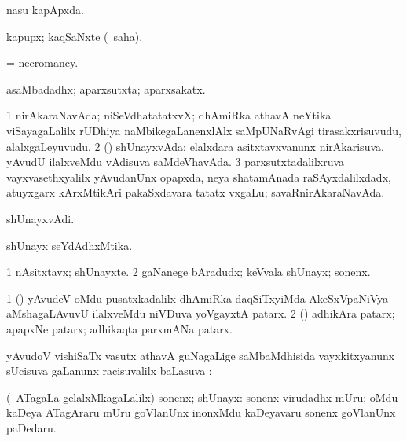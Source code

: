 \bentry
{}
\gl{\gu}
\bmng
nasu kapApxda. 
\emng
\eentry

\bentry
{}
\gl{\nA}
\bmng
kapupx; kaqSaNxte (\rUpa\ saha). 
\emng
\eentry

\bentry
{}
\gl{\nA}
\bmng
= \hyperlink{necromancy}{necromancy}. 
\emng
\eentry

\bentry
{}
\gl{\gu}
\expl{\Latin}
\bmng
asaMbadadhx; aparxsutxta; aparxsakatx. 
\emng
\eentry

\bentry
{}
\gl{\nA}
\bmng
\bnum
\num{1} nirAkaraNavAda; niSeVdhatatatxvX; dhAmiRka athavA neYtika viSayagaLalilx rUDhiya naMbikegaLanenxlAlx saMpUNaRvAgi tirasakxrisuvudu, alalxgaLeyuvudu. 
\num{2} (\tashA) shUnayxvAda; elalxdara asitxtavxvanunx nirAkarisuva, yAvudU ilalxveMdu vAdisuva saMdeVhavAda. 
\num{3} parxsutxtadalilxruva vayxvasethxyalilx yAvudanUnx opapxda, neya shatamAnada raSAyxdalilxdadx, atuyxgarx kArxMtikAri pakaSxdavara tatatx vxgaLu; savaRnirAkaraNavAda. 
\enum
\emng
\eentry

\bentry
{}
\gl{\nA}
\bmng
shUnayxvAdi. 
\emng
\eentry

\bentry
{}
\gl{\gu}
\bmng
shUnayx seYdAdhxMtika. 
\emng
\eentry

\bentry
{}
\gl{\nA}
\bmng
\bnum
\num{1} nAsitxtavx; shUnayxte. 
\num{2} gaNanege bAradudx; keVvala shUnayx; sonenx. 
\enum
\emng
\eentry

\bentry
{}
\gl{\nA}
\expl{\Latin}
\bmng
\bnum
\num{1} (\roVkAyx) yAvudeV oMdu pusatxkadalilx dhAmiRka daqSiTxyiMda AkeSxVpaNiVya aMshagaLAvuvU ilalxveMdu niVDuva yoVgayxtA patarx. 
\num{2} (\rUpa) adhikAra patarx; apapxNe patarx; adhikaqta parxmANa patarx. 
\enum
\emng
\eentry

\bentry
{}
\gl{\uparx}
\bmng
yAvudoV vishiSaTx vasutx athavA guNagaLige saMbaMdhisida vayxkitxyanunx sUcisuva \nA gaLanunx racisuvalilx baLasuva \uparx:  
\emng
\eentry

\bentry
{}
\gl{\nA}
\bmng
(\kanmu\ ATagaLa gelalxMkagaLalilx) sonenx; shUnayx:  sonenx virudadhx mUru; oMdu kaDeya ATagAraru mUru goVlanUnx inonxMdu kaDeyavaru sonenx goVlanUnx paDedaru. 
\emng
\eentry

